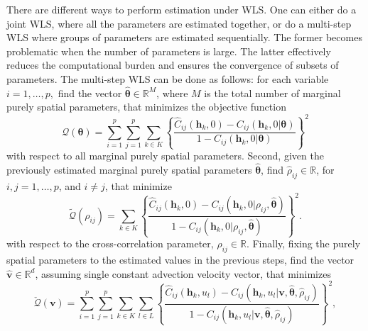 \documentclass[12pt]{article}
\newcommand{\0}{\mathbf{0}}
\begin{document}
There are different ways to perform estimation under WLS. One can either do a joint WLS, where all the parameters are estimated together, or do a multi-step WLS where groups of parameters are estimated sequentially. The former becomes problematic when the number of parameters is large. The latter effectively reduces the computational burden and ensures the convergence of subsets of parameters. The multi-step WLS can be done as follows: for each variable $i=1,\ldots,p,$ find the vector $\widehat{\boldsymbol{\theta}}\in \mathbb{R}^M$, where $M$ is the total number of marginal purely spatial parameters, that  minimizes the objective function
\begin{equation}\label{eqn:objective_function1}
\mathcal{Q}(\boldsymbol{\theta})=\sum_{i=1}^{p}\sum_{j=1}^{p} \sum_{k \in K}\left\{\frac{\hat{C}_{ij}(\mathbf{h}_{k},0)-C_{ij}(\mathbf{h}_{k},0|\boldsymbol{\theta})}{1-C_{ij}(\mathbf{h}_{k},0|\boldsymbol{\theta})}\right\}^2
\end{equation}
with respect to all marginal purely spatial parameters. Second, given the previously estimated marginal purely spatial parameters $\widehat{\boldsymbol{\theta}}$, find $\widehat{\rho}_{ij} \in \mathbb{R}$, for $i,j=1,\ldots,p$, and $i\neq j$, that minimize 
\begin{equation}\label{eqn:objective_function2}
\tilde{\mathcal{Q}}(\rho_{ij})=\sum_{k\in K}\left\{\frac{\hat{C}_{ij}(\mathbf{h}_{k},0)-C_{ij}(\mathbf{h}_{k},0|\rho_{ij}, \widehat{\boldsymbol{\theta}})}{1-C_{ij}(\mathbf{h}_{k},0|\rho_{ij}, \widehat{\boldsymbol{\theta}})}\right\}^2.
\end{equation}
with respect to the cross-correlation parameter, $\rho_{ij} \in \mathbb{R}$. Finally, fixing the purely spatial parameters to the estimated values in the previous steps, find the vector $\widehat{\mathbf{v}}\in \mathbb{R}^{d}$, assuming single constant advection velocity vector, that minimizes 
\begin{equation}\label{estimatingv}
\check{\mathcal{Q}}(\mathbf{v})=\sum_{i=1}^{p}\sum_{j=1}^{p} \sum_{k\in K}\sum_{l\in L}\left\{\frac{\hat{C}_{ij}(\mathbf{h}_{k},u_l)-C_{ij}(\mathbf{h}_{k},u_l|\mathbf{v}, \widehat{\boldsymbol{\theta}}, \widehat{\rho}_{ij})}{1-C_{ij}(\mathbf{h}_{k},u_l|\mathbf{v}, \widehat{\boldsymbol{\theta}}, \widehat{\rho}_{ij})}\right\}^2,
\end{equation}
\end{document}
